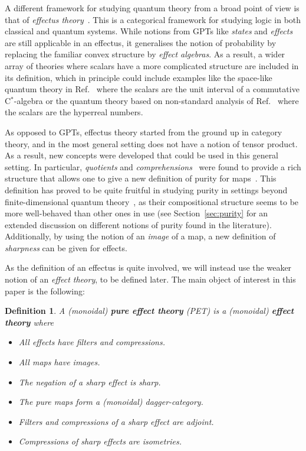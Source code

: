 \documentclass[a4paper,onecolumn,10pt,accepted=2019-05-03, issue=1, volume=1, shorttitle=papers/compositionality-1-1]{compositionalityarticle}
\numberwithin{counter}{section}
\newtheorem*{definition*}{Definition}
\begin{document}
A different framework for studying quantum theory from a broad point of view is that of \emph{effectus theory}~\cite{cho2015introduction}. This is a categorical framework for studying logic in both classical and quantum systems. While notions from GPTs like \emph{states} and \emph{effects} are still applicable in an effectus, it generalises the notion of probability by replacing the familiar convex structure by \emph{effect algebras}. As a result, a wider array of theories where scalars have a more complicated structure are included in its definition, which in principle could include examples like the space-like quantum theory in Ref.~\cite{moliner2017space} where the scalars are the unit interval of a commutative C$^*$-algebra or the quantum theory based on non-standard analysis of Ref.~\cite{gogiosotowards} where the scalars are the hyperreal numbers.

As opposed to GPTs, effectus theory started from the ground up in category theory, and in the most general setting does not have a notion of tensor product. As a result, new concepts were developed that could be used in this general setting. In particular, \emph{quotients} and \emph{comprehensions}~\cite{cho2015quotient} were found to provide a rich structure that allows one to give a new definition of purity for maps~\cite{bramthesis,basthesis}. This definition has proved to be quite fruitful in studying purity in settings beyond finite-dimensional quantum theory~\cite{westerbaan2016paschke,westerbaan2016universal,westerbaan2018puremaps}, as their compositional structure seems to be more well-behaved than other ones in use (see Section~\ref{sec:purity} for an extended discussion on different notions of purity found in the literature). 
Additionally, by using the notion of an \emph{image} of a map, a new definition of \emph{sharpness} can be given for effects.

As the definition of an effectus is quite involved, we will instead use the weaker notion of an \emph{effect theory}, to be defined later. The main object of interest in this paper is the following:

\begin{definition*}
    A (monoidal) \textbf{pure effect theory} (PET) is a (monoidal) \textbf{effect theory} where
    \begin{itemize}
        \item All effects have filters and compressions.
        \item All maps have images.
        \item The negation of a sharp effect is sharp.
        \item The pure maps form a (monoidal) dagger-category.
        \item Filters and compressions of a sharp effect are adjoint.
        \item Compressions of sharp effects are isometries.
    \end{itemize}
\end{definition*}
\end{document}
